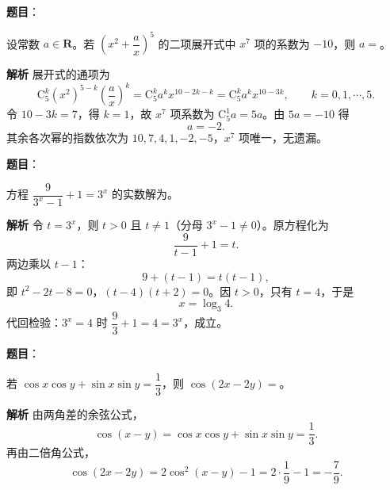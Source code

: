 \begin{answer}

\textbf{题目}：

设常数 $a\in\mathbf R$。若 $\left(x^2+\dfrac ax\right)^5$ 的二项展开式中 $x^7$ 项的系数为 $-10$，则 $a=$\gkblank{}。

\textbf{解析}
展开式的通项为
\nopagebreak[4]
\[\mathrm C_5^k\left(x^2\right)^{5-k}\left(\frac ax\right)^k=\mathrm C_5^k a^k x^{10-2k-k}=\mathrm C_5^k a^k x^{10-3k},\qquad k=0,1,\cdots,5.\]
令 $10-3k=7$，得 $k=1$，故 $x^7$ 项系数为 $\mathrm C_5^1a=5a$。由 $5a=-10$ 得
\nopagebreak[4]
\[a=-2.\]
其余各次幂的指数依次为 $10,7,4,1,-2,-5$，$x^7$ 项唯一，无遗漏。


\end{answer}
\begin{answer}

\textbf{题目}：

方程 $\dfrac{9}{3^x-1}+1=3^x$ 的实数解为\gkblank{}。

\textbf{解析}
令 $t=3^x$，则 $t>0$ 且 $t\neq1$（分母 $3^x-1\neq0$）。原方程化为
\nopagebreak[4]
\[\frac{9}{t-1}+1=t.\]
两边乘以 $t-1$：
\nopagebreak[4]
\[9+(t-1)=t(t-1),\]
即 $t^2-2t-8=0$，$(t-4)(t+2)=0$。因 $t>0$，只有 $t=4$，于是
\nopagebreak[4]
\[x=\log_3 4.\]
代回检验：$3^x=4$ 时 $\dfrac9{3}+1=4=3^x$，成立。


\end{answer}
\begin{answer}

\textbf{题目}：

若 $\cos x\cos y+\sin x\sin y=\dfrac13$，则 $\cos(2x-2y)=$\gkblank{}。

\textbf{解析}
由两角差的余弦公式，
\nopagebreak[4]
\[\cos(x-y)=\cos x\cos y+\sin x\sin y=\frac13.\]
再由二倍角公式，
\nopagebreak[4]
\[\cos(2x-2y)=2\cos^2(x-y)-1=2\cdot\frac19-1=-\frac79.\]


\end{answer}
